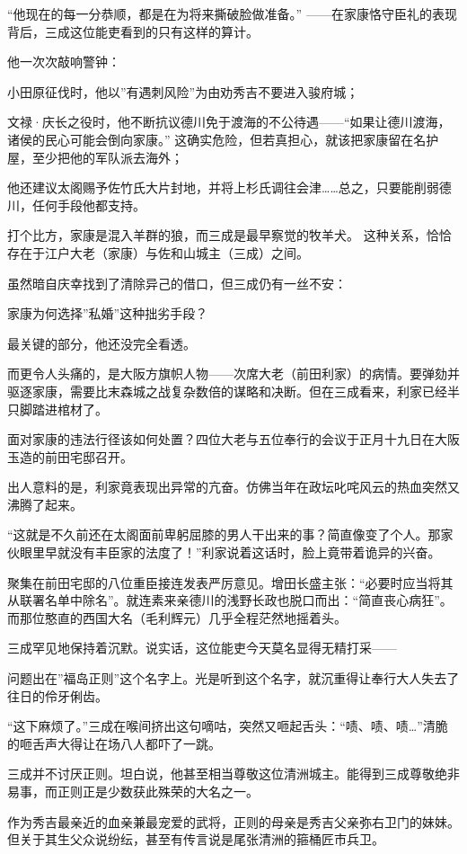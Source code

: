 \documentclass[
]{book}
\begin{document}
``他现在的每一分恭顺，都是在为将来撕破脸做准备。'' ------在家康恪守臣礼的表现背后，三成这位能吏看到的只有这样的算计。

他一次次敲响警钟：

小田原征伐时，他以''有遇刺风险''为由劝秀吉不要进入骏府城；

文禄·庆长之役时，他不断抗议德川免于渡海的不公待遇------``如果让德川渡海，诸侯的民心可能会倒向家康。'' 这确实危险，但若真担心，就该把家康留在名护屋，至少把他的军队派去海外；

他还建议太阁赐予佐竹氏大片封地，并将上杉氏调往会津\ldots\ldots 总之，只要能削弱德川，任何手段他都支持。

打个比方，家康是混入羊群的狼，而三成是最早察觉的牧羊犬。 这种关系，恰恰存在于江户大老（家康）与佐和山城主（三成）之间。

虽然暗自庆幸找到了清除异己的借口，但三成仍有一丝不安：

家康为何选择''私婚''这种拙劣手段？

最关键的部分，他还没完全看透。

而更令人头痛的，是大阪方旗帜人物------次席大老（前田利家）的病情。要弹劾并驱逐家康，需要比末森城之战复杂数倍的谋略和决断。但在三成看来，利家已经半只脚踏进棺材了。

面对家康的违法行径该如何处置？四位大老与五位奉行的会议于正月十九日在大阪玉造的前田宅邸召开。

出人意料的是，利家竟表现出异常的亢奋。仿佛当年在政坛叱咤风云的热血突然又沸腾了起来。

``这就是不久前还在太阁面前卑躬屈膝的男人干出来的事？简直像变了个人。那家伙眼里早就没有丰臣家的法度了！''利家说着这话时，脸上竟带着诡异的兴奋。

聚集在前田宅邸的八位重臣接连发表严厉意见。增田长盛主张：``必要时应当将其从联署名单中除名''。就连素来亲德川的浅野长政也脱口而出：``简直丧心病狂''。而那位憨直的西国大名（毛利辉元）几乎全程茫然地摇着头。

三成罕见地保持着沉默。说实话，这位能吏今天莫名显得无精打采------

问题出在''福岛正则''这个名字上。光是听到这个名字，就沉重得让奉行大人失去了往日的伶牙俐齿。

``这下麻烦了。''三成在喉间挤出这句嘀咕，突然又咂起舌头：``啧、啧、啧\ldots{}''清脆的咂舌声大得让在场八人都吓了一跳。

三成并不讨厌正则。坦白说，他甚至相当尊敬这位清洲城主。能得到三成尊敬绝非易事，而正则正是少数获此殊荣的大名之一。

作为秀吉最亲近的血亲兼最宠爱的武将，正则的母亲是秀吉父亲弥右卫门的妹妹。但关于其生父众说纷纭，甚至有传言说是尾张清洲的箍桶匠市兵卫。
\end{document}

